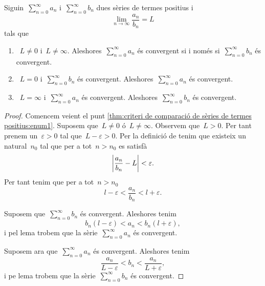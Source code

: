 \documentclass[../../main.tex]{subfiles}
\begin{document}
    \begin{theorem}
        \label{thm:criteri de comparació de sèries de termes positius}
        Siguin~\(\sum_{n=0}^{\infty}a_{n}\) i~\(\sum_{n=0}^{\infty}b_{n}\) dues sèries de termes positius i
        \[
            \lim_{n\to\infty}\frac{a_{n}}{b_{n}}=L
        \]
        tals que
        \begin{enumerate}
            \item\label{thm:criteri de comparació de sèries de termes positius:enum1}~\(L\neq0\) i~\(L\neq\infty\).
            Aleshores~\(\sum_{n=0}^{\infty}a_{n}\) és convergent si i només si~\(\sum_{n=0}^{\infty}b_{n}\) és convergent.
            \item\label{thm:criteri de comparació de sèries de termes positius:enum2}~\(L=0\) i~\(\sum_{n=0}^{\infty}b_{n}\) és convergent.
            Aleshores~\(\sum_{n=0}^{\infty}a_{n}\) és convergent.
            \item\label{thm:criteri de comparació de sèries de termes positius:enum3}~\(L=\infty\) i~\(\sum_{n=0}^{\infty}a_{n}\) és convergent.
            Aleshores~\(\sum_{n=0}^{\infty}b_{n}\) és convergent.
        \end{enumerate}
        \begin{proof}
            Comencem veient el punt \eqref{thm:criteri de comparació de sèries de termes positius:enum1}.
            Suposem que~\(L\neq0\) ó~\(L\neq\infty\).
            Observem que~\(L>0\).
            Per tant prenem un~\(\varepsilon>0\) tal que~\(L-\varepsilon>0\).
            Per la definició de  tenim que existeix un natural~\(n_{0}\) tal que per a tot~\(n>n_{0}\) es satisfà
            \[
                \abs{\frac{a_{n}}{b_{n}}-L}<\varepsilon.
            \]
            Per tant tenim que per a tot~\(n>n_{0}\)
            \[
                l-\varepsilon<\frac{a_{n}}{b_{n}}<l+\varepsilon.
            \]

            Suposem que~\(\sum_{n=0}^{\infty}b_{n}\) és convergent.
            Aleshores tenim
            \[
                b_{n}(l-\varepsilon)<a_{n}<b_{n}(l+\varepsilon),
            \]
            i pel lema  trobem que la sèrie~\(\sum_{n=0}^{\infty}a_{n}\) és convergent.

            Suposem ara que~\(\sum_{n=0}^{\infty}a_{n}\) és convergent.
            Aleshores tenim
            \[
                \frac{a_{n}}{L-\varepsilon}<b_{n}<\frac{a_{n}}{L+\varepsilon},
            \]
            i pe lema  trobem que la sèrie~\(\sum_{n=0}^{\infty}b_{n}\) és convergent.


\end{proof}
\end{theorem}
\end{document}
